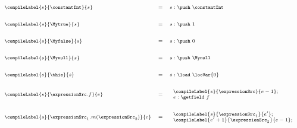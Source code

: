 

\begin{figure}[ht!]
\begin{frameit}
$${\scriptsize 
        \begin{array}{lll} 
	\compileLabel{s}{\constantInt}{s} &  =  & s : \push \  \constantInt \\
	& & \\ & & \\
	\compileLabel{s}{\Mytrue}{s} & = &  s: \push  \ 1\\
	& & \\ & & \\
	\compileLabel{s}{\Myfalse}{s} & = &  s: \push \ 0 \\
	& & \\ & & \\
	\compileLabel{s}{\Mynull }{s } & = &  s: \push \ \Mynull\\
	& & \\ & & \\
	\compileLabel{s}{\this}{s } & = &  s:  \load \ \locVar{0} \\
	& & \\ & & \\ 
	\compileLabel{s}{ \expressionSrc.f}{e} & = &    
         \begin{array}{l}
              \compileLabel{s}{\expressionSrc}{e - 1}; \\ 
              e : \getfield  \ f
           \end{array} \\
	& & \\ & & \\ 
	\compileLabel{s}{\expressionSrc_1.m(\expressionSrc_2)}{e} & = &  
	   \begin{array}{l}  
                 \compileLabel{s}{\expressionSrc_1}{e'};\\
		 \compileLabel{e' + 1}{\expressionSrc_2}{e - 1};\\

\end{array}
\end{array}}$$
\end{frameit}
\end{figure}
